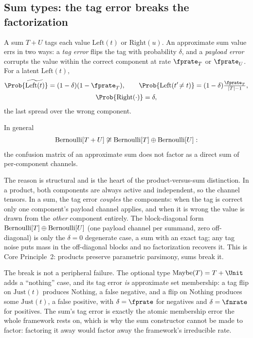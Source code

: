 \subsection*{Sum types: the tag error breaks the factorization}

A sum $T + U$ tags each value $\mathrm{Left}(t)$ or $\mathrm{Right}(u)$. An
approximate sum value errs in two ways: a \emph{tag error} flips
the tag with probability $\delta$, and a \emph{payload error} corrupts the value within the
correct component at rate $\fprate_T$ or $\fprate_U$. For a latent
$\mathrm{Left}(t)$,
\begin{gather*}
  \Prob{\widetilde{\mathrm{Left}(t)}} = (1 - \delta)(1 - \fprate_T),
  \qquad
  \Prob{\mathrm{Left}(t'\!\neq t)} = (1 - \delta)\tfrac{\fprate_T}{|T| - 1},
  \\
  \Prob{\mathrm{Right}(\cdot)} = \delta,
\end{gather*}
the last spread over the wrong component.

\begin{proposition}
\label{prop:sum-nonfactor}
In general
\[
  \mathrm{Bernoulli}[T + U] \not\cong \mathrm{Bernoulli}[T] \oplus \mathrm{Bernoulli}[U]:
\]
the confusion matrix of an approximate sum does not factor as a direct sum of
per-component channels.
\end{proposition}

The reason is structural and is the heart of the product-versus-sum distinction.
In a product, both components are always active and independent, so the channel
tensors. In a sum, the tag error \emph{couples} the components: when the tag is
correct only one component's payload channel applies, and when it is wrong the
value is drawn from the \emph{other} component entirely. The block-diagonal form
$\mathrm{Bernoulli}[T] \oplus \mathrm{Bernoulli}[U]$ (one payload channel per summand, zero
off-diagonal) is only the $\delta = 0$ degenerate case, a sum with an exact tag;
any tag noise puts mass in the off-diagonal blocks and no factorization
recovers it. This is Core Principle~2: products preserve parametric parsimony, sums
break it.

The break is not a peripheral failure. The optional type $\mathrm{Maybe}(T) = T +
\Unit$ adds a ``nothing'' case, and its tag error \emph{is} approximate set
membership: a tag flip on $\mathrm{Just}(t)$ produces $\mathrm{Nothing}$, a false
negative, and a flip on $\mathrm{Nothing}$ produces some $\mathrm{Just}(t)$, a
false positive, with $\delta = \fprate$ for negatives and $\delta = \fnrate$ for
positives. The sum's tag error is exactly the atomic membership error the whole
framework rests on, which is why the sum constructor cannot be made to factor:
factoring it away would factor away the framework's irreducible rate.

